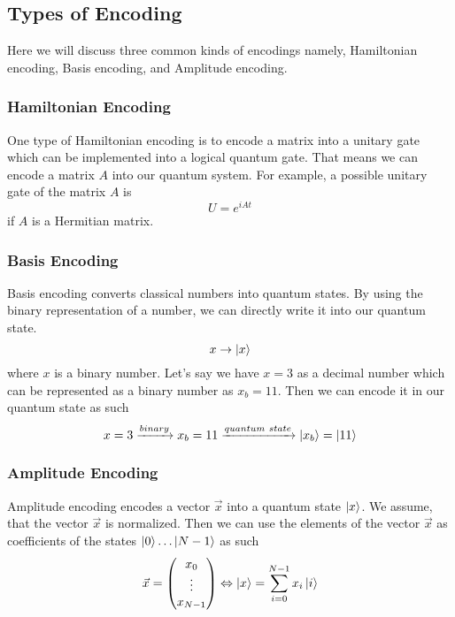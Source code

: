 \subsection{Types of Encoding}
\label{sec:types-encoding}
Here we will discuss three common kinds of encodings namely, Hamiltonian encoding, Basis encoding, and Amplitude encoding.

\subsubsection{Hamiltonian Encoding}
One type of Hamiltonian encoding is to encode a matrix into a unitary gate which can be implemented into a logical quantum gate. 
That means we can encode a matrix $A$ into our quantum system.
For example, a possible unitary gate of the matrix $A$ is
\begin{equation}
    U = e^{iAt}
\end{equation}
if $A$ is a Hermitian matrix.

\subsubsection{Basis Encoding}
Basis encoding converts classical numbers into quantum states.
By using the binary representation of a number, we can directly write it into our quantum state. 
\begin{equation}
    x \rightarrow \ket {x}
\end{equation}
where $x$ is a binary number.
Let's say we have $x=3$ as a decimal number which can be represented as a binary number as $x_b = 11$.
Then we can encode it in our quantum state as such
\begin{equation}
    x=3 \xrightarrow[]{binary} x_b = 11 \xrightarrow[]{quantum\  state} \ket{x_b} = \ket{11}
\end{equation}

\subsubsection{Amplitude Encoding}
Amplitude encoding encodes a vector $\vec x$ into a quantum state $\ket x$. 
We assume, that the vector $\vec x$ is normalized. 
Then we can use the elements of the vector $\vec x$ as coefficients of the states $\ket 0 \dots \ket {N-1}$ as such
\begin{equation}
    \vec{x} = \begin{pmatrix} x_0\\ \vdots \\ x_{N-1} \end{pmatrix} 
    \Leftrightarrow  
     \ket x = \sum_{i=0}^{N-1} x_i \ket i
\end{equation}

